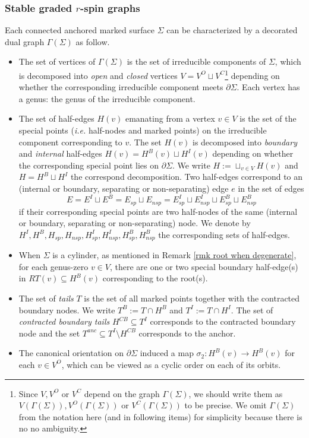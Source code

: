 \documentclass[11pt]{amsart}
\theoremstyle{definition}
\theoremstyle{remark}
\newcommand{\<}{\left<}
\renewcommand{\>}{\right>}
\numberwithin{equation}{section}
\begin{document}
\subsubsection{Stable graded $r$-spin graphs}
Each connected anchored marked surface $\Sigma$ can be characterized by a decorated dual graph $\Gamma(\Sigma)$ as follow.
\begin{itemize}
\item The set of vertices of $\Gamma(\Sigma)$ is the set of irreducible components of $\Sigma$, which is decomposed into \textit{open} and \textit{closed} vertices  $V = V^O \sqcup V^C$\footnote{Since $V,V^O$ or $V^C$ depend on the graph $\Gamma(\Sigma)$, we should write them as $V(\Gamma(\Sigma)),V^O(\Gamma(\Sigma))$ or $V^C(\Gamma(\Sigma))$ to be precise. We omit $\Gamma(\Sigma)$ from the notation here (and in following items) for simplicity because there is no no ambiguity.} depending on whether the corresponding irreducible component meets $\partial \Sigma$. 
Each vertex has a genus: the genus of the irreducible component.

\item The set of half-edges $H(v)$ emanating from a vertex $v\in V$ is the set of the special points (\textit{i.e.} half-nodes and marked points) on the irreducible component corresponding to $v$. The set $H(v)$ is decomposed into \textit{boundary} and \textit{internal} half-edges $H(v) = H^B(v) \sqcup H^I(v)$ depending on whether the corresponding special point lies on $\partial \Sigma$. We write $H:=\sqcup_{v\in V}H(v)$ and $H = H^B \sqcup H^I$ the correspond decomposition. Two half-edges correspond to an (internal or boundary, separating or non-separating) edge $e$ in the set of edges $$E=E^I\sqcup E^B=E_{sp}\sqcup E_{nsp}=E^I_{sp}\sqcup E^I_{nsp}\sqcup E^B_{sp}\sqcup E^B_{nsp}$$ if their corresponding special points are two half-nodes of the same (internal or boundary, separating or non-separating) node.  We denote by $H^I,H^B,H_{sp},H_{nsp},H^I_{sp},H^I_{nsp},H^B_{sp},H^B_{nsp}$ the corresponding sets of half-edges.

\item
When $\Sigma$ is a cylinder, as mentioned in Remark \ref{rmk root when degenerate}, for each genus-zero $v \in V$, there are one or two special boundary half-edge(s) in $RT(v)\subseteq H^B(v)$ corresponding to the root(s). 

\item The set of \textit{tails} $T$ is the set of all marked points together with the contracted boundary nodes. We write $T^B:=T\cap H^B$ and $T^I:=T\cap H^I$. The set of \textit{contracted boundary tails} $H^{CB}\subseteq T^I$ corresponds to the contracted boundary node and the set $T^{anc}\subseteq T^I\setminus H^{CB}$ corresponds to the anchor.
\item 
The canonical orientation on $\partial\Sigma$ induced a map $\sigma_2\colon H^B(v) \to H^B(v)$ for each $v\in V^O$, which can be viewed as a cyclic order on each of its orbits.
\end{itemize}
\end{document}
